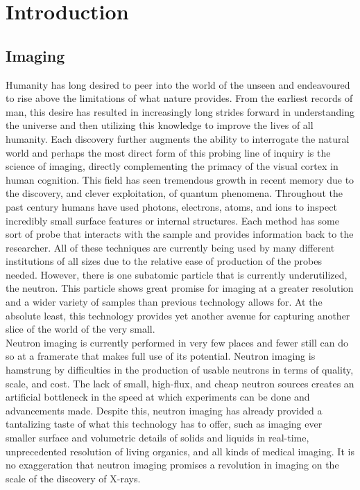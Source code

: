 \label{sec:introduction}
\section{Introduction}

\subsection{Imaging}
Humanity has long desired to peer into the world of the unseen and endeavoured to rise above the limitations of what nature provides. From the earliest records of man, this desire has resulted in increasingly long strides forward in understanding the universe and then utilizing this knowledge to improve the lives of all humanity. Each discovery further augments the ability to interrogate the natural world and perhaps the most direct form of this probing line of inquiry is the science of imaging, directly complementing the primacy of the visual cortex in human cognition. This field has seen tremendous growth in recent memory due to the discovery, and clever exploitation, of quantum phenomena. Throughout the past century humans have used photons, electrons, atoms, and ions to inspect incredibly small surface features or internal structures. Each method has some sort of probe that interacts with the sample and provides information back to the researcher. All of these techniques are currently being used by many different institutions of all sizes due to the relative ease of production of the probes needed. However, there is one subatomic particle that is currently underutilized, the neutron. This particle shows great promise for imaging at a greater resolution and a wider variety of samples than previous technology allows for. At the absolute least, this technology provides yet another avenue for capturing another slice of the world of the very small.\\

Neutron imaging is currently performed in very few places and fewer still can do so at a framerate that makes full use of its potential. Neutron imaging is hamstrung by difficulties in the production of usable neutrons in terms of quality, scale, and cost. The lack of small, high-flux, and cheap neutron sources creates an artificial bottleneck in the speed at which experiments can be done and advancements made. Despite this, neutron imaging has already provided a tantalizing taste of what this technology has to offer, such as imaging ever smaller surface and volumetric details of solids and liquids in real-time, unprecedented resolution of living organics, and all kinds of medical imaging. It is no exaggeration that neutron imaging promises a revolution in imaging on the scale of the discovery of X-rays.\\

